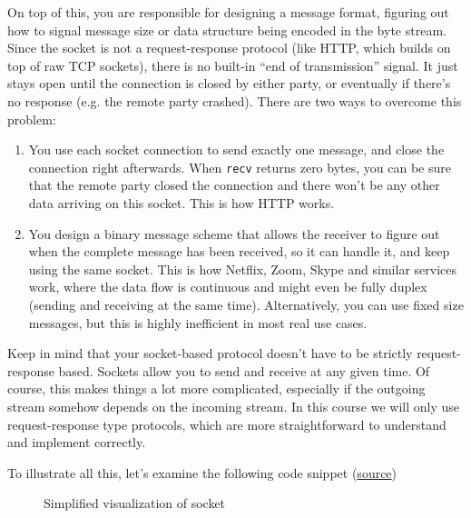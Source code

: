 On top of this, you are responsible for designing a message format, figuring out how to signal message size or data structure being encoded in the byte stream. Since the socket is not a request-response protocol (like HTTP, which builds on top of raw TCP sockets), there is no built-in “end of transmission” signal. It just stays open until the connection is closed by either party, or eventually if there’s no response (e.g. the remote party crashed). 
There are two ways to overcome this problem:

\begin{enumerate}
\item You use each socket connection to send exactly one message, and close the connection right afterwards. When \texttt{recv} returns zero bytes, you can be sure that the remote party closed the connection and there won’t be any other data arriving on this socket. This is how HTTP works.
\item You design a binary message scheme that allows the receiver to figure out when the complete message has been received, so it can handle it, and keep using the same socket. This is how Netflix, Zoom, Skype and similar services work, where the data flow is continuous and might even be fully duplex (sending and receiving at the same time). Alternatively, you can use fixed size messages, but this is highly inefficient in most real use cases. 
\end{enumerate}

Keep in mind that your socket-based protocol doesn’t have to be strictly request-response based. Sockets allow you to send and receive at any given time. Of course, this makes things a lot more complicated, especially if the outgoing stream somehow depends on the incoming stream. In this course we will only use request-response type protocols, which are more straightforward to understand and implement correctly.

To illustrate all this, let’s examine the following code snippet (\href{https://docs.python.org/3.7/howto/sockets.html}{source})
\begin{figure}[t]
  \centering
  \caption{Simplified visualization of socket}
  \label{fig:viz-socket}
\end{figure}


